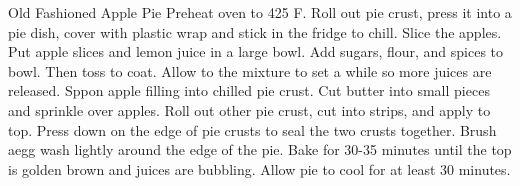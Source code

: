 \documentclass[../cookbook.tex]{subfiles}
\begin{document}
\begin{recipe}{Old Fashioned Apple Pie}{}{}
    Preheat oven to 425 \degrees{}F.
    Roll out pie crust, press it into a pie dish, cover with plastic wrap and
    stick in the fridge to chill.
    Slice the apples.
    Put apple slices and lemon juice in a large bowl.
    Add sugars, flour, and spices to bowl. Then toss to coat. Allow to the
    mixture to set a while so more juices are released. Sppon apple filling
    into chilled pie crust.
    Cut butter into small pieces and sprinkle over apples. Roll out other pie
    crust, cut into strips, and apply to top. Press down on the edge of pie
    crusts to seal the two crusts together.
    Brush aegg wash lightly around the edge of the pie. Bake for 30-35 minutes
    until the top is golden brown and juices are bubbling. Allow pie to cool
    for at least 30 minutes.
\end{recipe}
\end{document}
